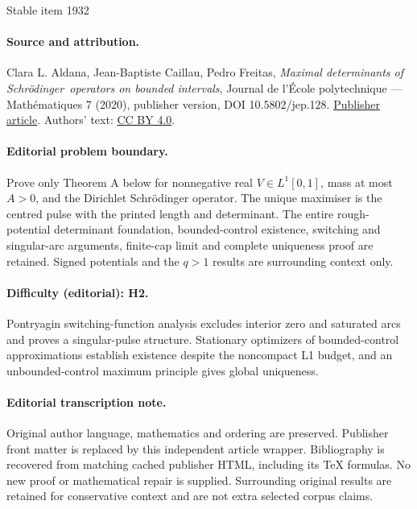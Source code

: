 \documentclass[11pt]{article}
\theoremstyle{plain}
\theoremstyle{definition}
\begin{document}
\begin{center}{\Large Stable item 1932}\end{center}
\paragraph{Source and attribution.}
Clara L. Aldana, Jean-Baptiste Caillau, Pedro Freitas, \emph{Maximal determinants of Schrödinger operators on bounded intervals}, Journal de l’École polytechnique — Mathématiques 7 (2020), publisher version, DOI 10.5802/jep.128. \href{https://jep.centre-mersenne.org/articles/10.5802/jep.128/}{Publisher article}. Authors' text: \href{https://creativecommons.org/licenses/by/4.0/}{CC BY 4.0}.
\paragraph{Editorial problem boundary.}
Prove only Theorem A below for nonnegative real \(V\in L^1[0,1]\), mass at most \(A>0\), and the Dirichlet Schrödinger operator. The unique maximiser is the centred pulse with the printed length and determinant. The entire rough-potential determinant foundation, bounded-control existence, switching and singular-arc arguments, finite-cap limit and complete uniqueness proof are retained. Signed potentials and the \(q>1\) results are surrounding context only.
\paragraph{Difficulty (editorial): H2.}
Pontryagin switching-function analysis excludes interior zero and saturated arcs and proves a singular-pulse structure. Stationary optimizers of bounded-control approximations establish existence despite the noncompact L1 budget, and an unbounded-control maximum principle gives global uniqueness.
\paragraph{Editorial transcription note.}
Original author language, mathematics and ordering are preserved. Publisher front matter is replaced by this independent article wrapper. Bibliography is recovered from matching cached publisher HTML, including its TeX formulas. No new proof or mathematical repair is supplied. Surrounding original results are retained for conservative context and are not extra selected corpus claims.
\clearpage

\end{document}
